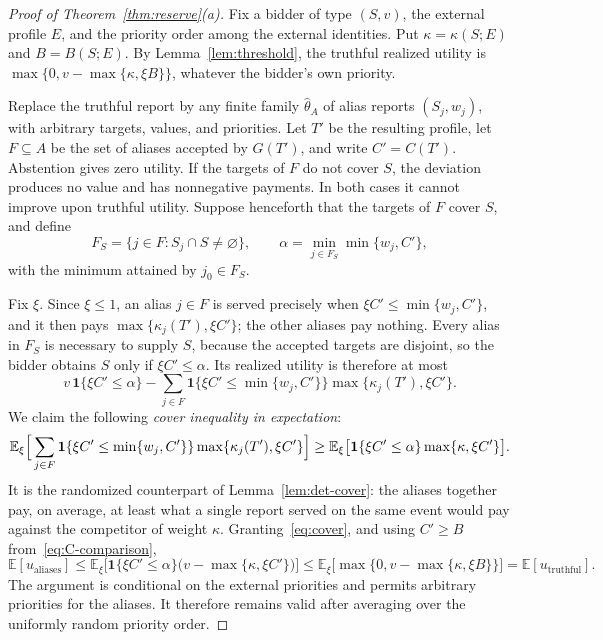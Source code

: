 \documentclass[format=acmsmall, review=false]{acmart}
\newcommand{\E}{\mathbb{E}}
\begin{document}
\begin{proof}[Proof of Theorem~\ref{thm:reserve}(a)]
Fix a bidder of type \((S,v)\), the external profile \(E\), and
the priority order among the external identities. Put
\(\kappa=\kappa(S;E)\) and \(B=B(S;E)\). By
Lemma~\ref{lem:threshold}, the truthful realized utility is
\(\max\{0,v-\max\{\kappa,\xi B\}\}\), whatever the bidder's own
priority.

Replace the truthful report by any finite family
\(\hat\theta_A\) of alias reports \((S_j,w_j)\), with arbitrary
targets, values, and priorities. Let \(T'\) be the resulting
profile, let \(F\subseteq A\) be the set of aliases accepted by
\(G(T')\), and write \(C'=C(T')\). Abstention gives zero utility.
If the targets of \(F\) do not cover \(S\), the deviation
produces no value and has nonnegative payments. In both cases it
cannot improve upon truthful utility. Suppose henceforth that
the targets of \(F\) cover \(S\), and define
\[
F_S=\{j\in F:S_j\cap S\ne\varnothing\},
\qquad
\alpha=\min_{j\in F_S}\min\{w_j,C'\},
\]
with the minimum attained by \(j_0\in F_S\).

Fix \(\xi\). Since \(\xi\le1\), an alias \(j\in F\) is served
precisely when \(\xi C'\le\min\{w_j,C'\}\), and it then pays
\(\max\{\kappa_j(T'),\xi C'\}\); the other aliases pay nothing.
Every alias in \(F_S\) is necessary to supply \(S\), because the
accepted targets are disjoint, so the bidder obtains \(S\) only
if \(\xi C'\le\alpha\). Its realized utility is therefore at
most
\begin{equation}\label{eq:attack}
v\,\mathbf{1}\{\xi C'\le\alpha\}
-\sum_{j\in F}
\mathbf{1}\{\xi C'\le\min\{w_j,C'\}\}
\max\{\kappa_j(T'),\xi C'\}.
\end{equation}
We claim the following \emph{cover inequality in expectation}:
\begin{equation}\label{eq:cover}
\E_\xi\Bigl[\,
\sum_{j\in F}
\mathbf{1}\{\xi C'\le\min\{w_j,C'\}\}
\max\{\kappa_j(T'),\xi C'\}
\Bigr]
\ge
\E_\xi\bigl[
\mathbf{1}\{\xi C'\le\alpha\}\max\{\kappa,\xi C'\}
\bigr].
\end{equation}
It is the randomized counterpart of
Lemma~\ref{lem:det-cover}: the aliases together pay, on average,
at least what a single report served on the same event would pay
against the competitor of weight \(\kappa\).
Granting~\eqref{eq:cover}, and using \(C'\ge B\)
from~\eqref{eq:C-comparison},
\[
\E[u_{\mathrm{aliases}}]
\le
\E_\xi\bigl[
\mathbf{1}\{\xi C'\le\alpha\}
\bigl(v-\max\{\kappa,\xi C'\}\bigr)
\bigr]
\le
\E_\xi\bigl[\max\{0,v-\max\{\kappa,\xi B\}\}\bigr]
=
\E[u_{\mathrm{truthful}}].
\]
The argument is conditional on the external priorities and
permits arbitrary priorities for the aliases. It therefore
remains valid after averaging over the uniformly random priority
order.


\end{proof}
\end{document}
